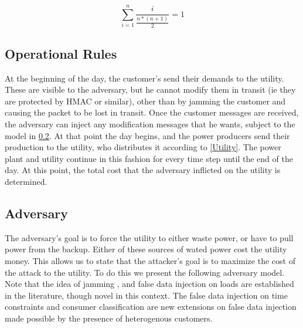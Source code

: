 \documentclass[conference]{IEEEtran}
\begin{document}
\begin{equation}
\label{probability}
\sum\limits_{i=1}^n \frac{i}{\frac{n*(n+1)}{2}} = 1
\end{equation}

\subsection{Operational Rules}
\label{Rules}

At the beginning of the day, the customer's send their demands to the utility. These are visible to the adversary, but he cannot modify them in transit (ie they are protected by HMAC or similar), other than by jamming the customer and causing the packet to be lost in transit.   Once the customer messages are received, the adversary can inject any modification messages that he wants, subject to the model in \ref{Adversary}. At that point the day begins, and the power producers send their production to the utility, who distributes it according to \ref{Utility}. The power plant and utility continue in this fashion for every time step until the end of the day. At this point, the total cost that the adversary inflicted
on the utility is determined.

\subsection{Adversary}
\label{Adversary}

The adversary's goal is to force the utility to either waste power, or have to pull power from the backup. Either of these sources of wated power cost the utility money. This allows us to state that the attacker's goal is to maximize the cost of the attack to the utility. To do this we present the following adversary model. Note that the idea of jamming \cite{gupta2010optimal}, and false data injection on loads \cite{lin2012false}\cite{yuan2011modeling} are established in the literature, though novel in this context. The false data injection on time constraints and consumer classification are new extensions on false data injection made possible by the presence of heterogenous customers.
\end{document}
